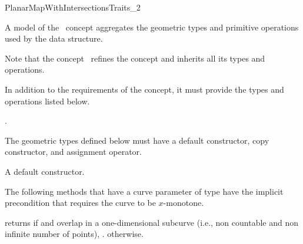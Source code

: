 
\ccRefPageBegin

\begin{ccRefConcept}{PlanarMapWithIntersectionsTraits_2}

\ccDefinition
A model of the \ccRefName\ concept aggregates the geometric types and
primitive operations used by the 
 data structure.

Note that the concept \ccRefName\ refines the concept 
and inherits all its types and operations.

In addition to the requirements of the  concept, it must
provide the types and operations listed below.

\ccRefines
{} .

\ccTypes

The geometric types defined below must have a default constructor,
copy constructor, and assignment operator.



\ccCreation
    
{A default constructor.}

\ccOperations

The following methods that have a curve parameter of type
 have the implicit precondition that requires the
curve to be $x$-monotone.

         {returns  if  and  overlap
          in a one-dimensional subcurve (i.e., non countable and non infinite
	  number of points), . otherwise.}


\end{ccRefConcept}

